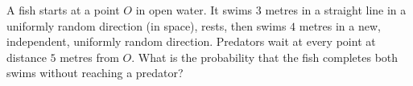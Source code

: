 A fish starts at a point $O$ in open water. It swims $3$ metres in a straight line in a uniformly random direction (in space), rests, then swims $4$ metres in a new, independent, uniformly random direction. Predators wait at every point at distance $5$ metres from $O$. What is the probability that the fish completes both swims without reaching a predator?
